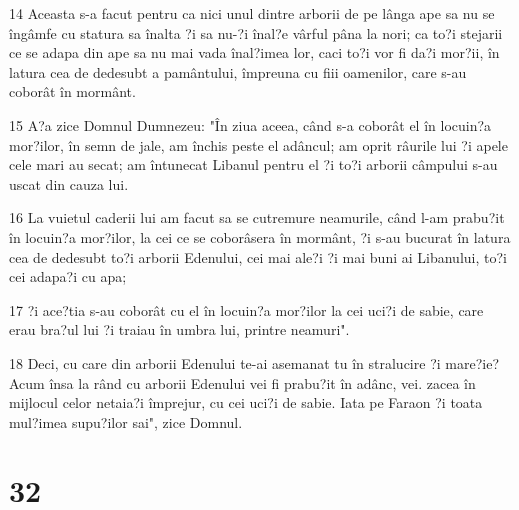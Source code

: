\par 14 Aceasta s-a facut pentru ca nici unul dintre arborii de pe lânga ape sa nu se îngâmfe cu statura sa înalta ?i sa nu-?i înal?e vârful pâna la nori; ca to?i stejarii ce se adapa din ape sa nu mai vada înal?imea lor, caci to?i vor fi da?i mor?ii, în latura cea de dedesubt a pamântului, împreuna cu fiii oamenilor, care s-au coborât în mormânt.
\par 15 A?a zice Domnul Dumnezeu: "În ziua aceea, când s-a coborât el în locuin?a mor?ilor, în semn de jale, am închis peste el adâncul; am oprit râurile lui ?i apele cele mari au secat; am întunecat Libanul pentru el ?i to?i arborii câmpului s-au uscat din cauza lui.
\par 16 La vuietul caderii lui am facut sa se cutremure neamurile, când l-am prabu?it în locuin?a mor?ilor, la cei ce se coborâsera în mormânt, ?i s-au bucurat în latura cea de dedesubt to?i arborii Edenului, cei mai ale?i ?i mai buni ai Libanului, to?i cei adapa?i cu apa;
\par 17 ?i ace?tia s-au coborât cu el în locuin?a mor?ilor la cei uci?i de sabie, care erau bra?ul lui ?i traiau în umbra lui, printre neamuri".
\par 18 Deci, cu care din arborii Edenului te-ai asemanat tu în stralucire ?i mare?ie? Acum însa la rând cu arborii Edenului vei fi prabu?it în adânc, vei. zacea în mijlocul celor netaia?i împrejur, cu cei uci?i de sabie. Iata pe Faraon ?i toata mul?imea supu?ilor sai", zice Domnul.

\chapter{32}

